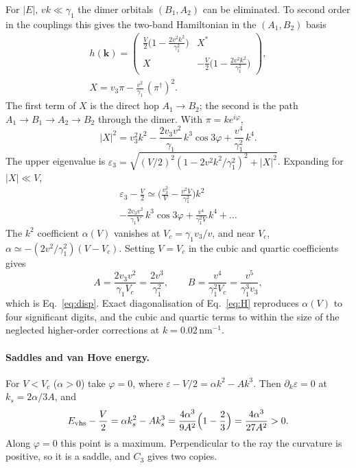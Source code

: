 \documentclass[aps,prb,twocolumn,superscriptaddress,floatfix,nofootinbib]{revtex4-2}
\newcommand{\bk}{\mathbf{k}}
\newcommand{\Evhs}{E_{\rm vhs}}
\newcommand{\nm}{\,\mathrm{nm}}
\begin{document}
For $|E|,\,vk\ll\gamma_1$ the dimer orbitals $(B_1,A_2)$ can be eliminated. To second order in the couplings this gives the two-band Hamiltonian in the $(A_1,B_2)$ basis~\cite{McCann2013}
\begin{gather}
h(\bk)=\begin{pmatrix}\frac V2\Big(1-\frac{2v^2k^2}{\gamma_1^2}\Big) & X^*\\[3pt] X & -\frac V2\Big(1-\frac{2v^2k^2}{\gamma_1^2}\Big)\end{pmatrix},\nonumber\\
X=v_3\pi-\frac{v^2}{\gamma_1}\,(\pi^\dagger)^2 .
\end{gather}
The first term of $X$ is the direct hop $A_1\to B_2$; the second is the path $A_1\to B_1\to A_2\to B_2$ through the dimer. With $\pi=ke^{i\varphi}$,
\begin{equation}
|X|^2=v_3^2k^2-\frac{2v_3v^2}{\gamma_1}\,k^3\cos3\varphi+\frac{v^4}{\gamma_1^2}\,k^4 .
\end{equation}
The upper eigenvalue is $\varepsilon_3=\sqrt{(V/2)^2(1-2v^2k^2/\gamma_1^2)^2+|X|^2}$. Expanding for $|X|\ll V$,
\begin{multline}
\varepsilon_3-\frac V2\simeq\Big(\frac{v_3^2}{V}-\frac{v^2V}{\gamma_1^2}\Big)k^2\\
-\frac{2v_3v^2}{\gamma_1V}\,k^3\cos3\varphi+\frac{v^4}{\gamma_1^2V}\,k^4+\dots
\end{multline}
The $k^2$ coefficient $\alpha(V)$ vanishes at $V_c=\gamma_1v_3/v$, and near $V_c$, $\alpha\simeq-(2v^2/\gamma_1^2)(V-V_c)$. Setting $V=V_c$ in the cubic and quartic coefficients gives
\begin{equation}
A=\frac{2v_3v^2}{\gamma_1V_c}=\frac{2v^3}{\gamma_1^2},\qquad B=\frac{v^4}{\gamma_1^2V_c}=\frac{v^5}{\gamma_1^3v_3},
\end{equation}
which is Eq.~\eqref{eq:disp}. Exact diagonalisation of Eq.~\eqref{eq:H} reproduces $\alpha(V)$ to four significant digits, and the cubic and quartic terms to within the size of the neglected higher-order corrections at $k=0.02\nm^{-1}$.

\paragraph{Saddles and van Hove energy.}
For $V<V_c$ ($\alpha>0$) take $\varphi=0$, where $\varepsilon-V/2=\alpha k^2-Ak^3$. Then $\partial_k\varepsilon=0$ at $k_s=2\alpha/3A$, and
\begin{equation}
\Evhs-\frac V2=\alpha k_s^2-Ak_s^3=\frac{4\alpha^3}{9A^2}\Big(1-\frac23\Big)=\frac{4\alpha^3}{27A^2}>0 .
\end{equation}
Along $\varphi=0$ this point is a maximum. Perpendicular to the ray the curvature is positive, so it is a saddle, and $C_3$ gives two copies.
\end{document}
